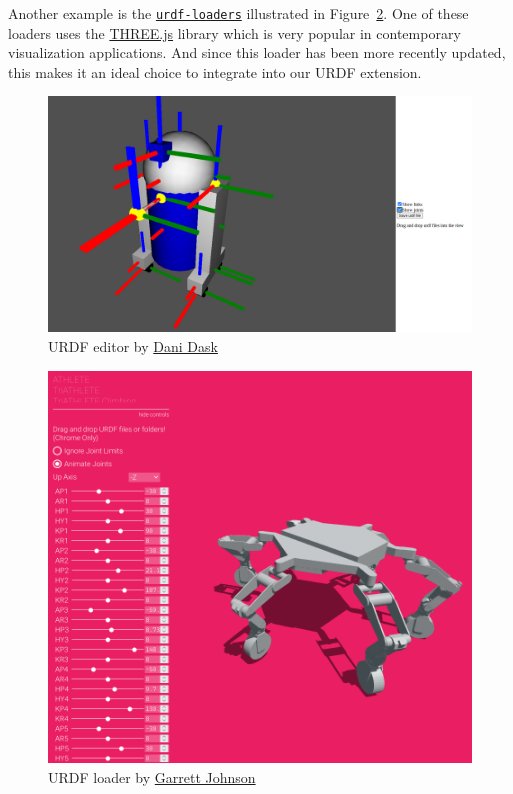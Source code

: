     Another example is the \href{https://github.com/gkjohnson/urdf-loaders}{\texttt{urdf-loaders}} illustrated in Figure~\ref{fig:johnsonURDF}. One of these loaders uses the \href{https://threejs.org/}{THREE.js} library which is very popular in contemporary visualization applications. And since this loader has been more recently updated, this makes it an ideal choice to integrate into our URDF extension.

    \begin{figure}[H]
        \centering
        \includegraphics[width=0.85\linewidth]{Images/11_r2d2URDF.png}
        \caption{URDF editor by \href{https://github.com/danidask}{Dani Dask}}
        \label{fig:r2d2}
    \end{figure}

    \begin{figure}[H]
        \centering
        \includegraphics[width=0.85\linewidth]{Images/11_johnsonURDF.png}
        \caption{URDF loader by \href{https://github.com/gkjohnson}{Garrett Johnson}}
        \label{fig:johnsonURDF}
    \end{figure}

